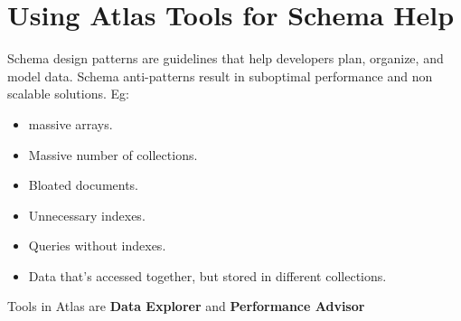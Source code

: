 \documentclass[../main.tex]{subfiles}
\begin{document}
\section{Using Atlas Tools for Schema Help}
Schema design patterns are guidelines that help developers plan, organize, and model data.
Schema anti-patterns result in suboptimal performance and non scalable solutions. Eg: 
\begin{itemize}
	\item massive arrays.
	\item Massive number of collections.
	\item Bloated documents. 
	\item Unnecessary indexes.
	\item Queries without indexes.
	\item Data that's accessed together, but stored in different collections.
\end{itemize}

Tools in Atlas are \textbf{Data Explorer} and \textbf{Performance Advisor}


\printglossaries
\end{document}
